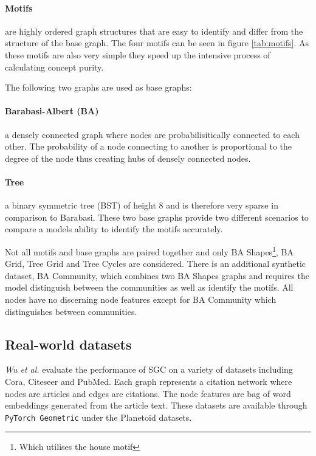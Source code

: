 \paragraph{Motifs}

are highly ordered graph structures that are easy to identify and differ from the structure of the base graph.
The four motifs can be seen in figure \ref{tab:motifs}.
As these motifs are also very simple they speed up the intensive process of calculating concept purity.

The following two graphs are used as base graphs:

\paragraph{Barabasi-Albert (BA)}
a densely connected graph where nodes are probabilisitically connected to each other.
The probability of a node connecting to another is proportional to the degree of the node thus creating hubs of densely connected nodes.

\paragraph{Tree}
a binary symmetric tree (BST) of height 8 and is therefore very sparse in comparison to Barabasi.
These two base graphs provide two different scenarios to compare a models ability to identify the motifs accurately.

Not all motifs and base graphs are paired together and only BA Shapes\footnote{Which utilises the house motif}, BA Grid, Tree Grid and Tree Cycles are considered.
There is an additional synthetic dataset, BA Community, which combines two BA Shapes graphs and requires the model distinguish between the communities as well as identify the motifs.
All nodes have no discerning node features except for BA Community which distinguishes between communities.

\subsection{Real-world datasets}
\label{sec:RWD}


\textit{Wu et al.}\cite{wu2019simplifying} evaluate the performance of SGC on a variety of datasets including Cora, Citeseer and PubMed\cite{citation}.
Each graph represents a citation network where nodes are articles and edges are citations.
The node features are bag of word embeddings generated from the article text.
These datasets are available through \texttt{PyTorch Geometric}\cite{Fey/Lenssen/2019} under the Planetoid\cite{planetoid} datasets.

